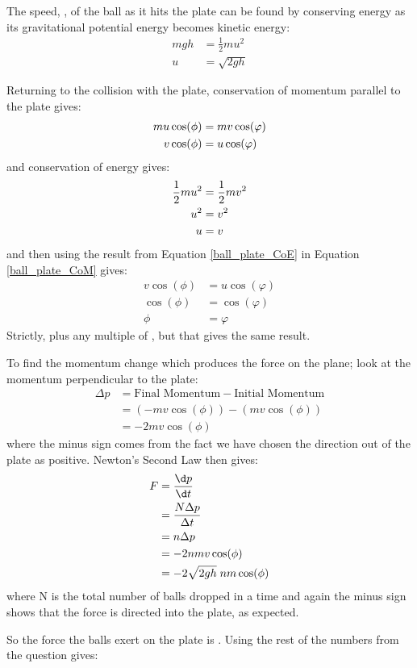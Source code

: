 \begin{problem}[HSC1946P1X1a]
{The speed, , of the ball as it hits the plate can be found by conserving energy as its gravitational potential energy becomes kinetic energy:
\begin{eqnarray*} 
mgh &= \frac{1}{2}mu^{2} \\ 
u &= \sqrt{2gh}
\end{eqnarray*}

Returning to the collision with the plate, conservation of momentum parallel to the plate gives:
\begin{eqnarray*}
 mu\cos(\phi) &= mv\cos(\varphi) \notag \\ 
 v\cos(\phi) &= u\cos(\varphi) \label{ball_plate_CoM} 
 \end{eqnarray*}
and conservation of energy gives:
\begin{eqnarray*}
 \frac{1}{2}mu^{2} &= \frac{1}{2}{m}v^{2} \notag \\ 
 u^{2} &= v^{2} \notag \\ 
 u &= v \label{ball_plate_CoE} 
\end{eqnarray*}
and then using the result from Equation \eqref{ball_plate_CoE} in Equation \eqref{ball_plate_CoM} gives:
\begin{eqnarray*} 
v\cos(\phi) &= u\cos(\varphi) \\ 
\cos(\phi) &= \cos(\varphi) \\ 
\phi &= \varphi
\end{eqnarray*}
Strictly,  plus any multiple of \quantity{2\pi}{}, but that gives the same result.

To find the momentum change which produces the force on the plane; look at the momentum perpendicular to the plate:
\begin{eqnarray*}
 \Delta p &= \text{Final Momentum} - \text{Initial Momentum} \\ 
 &= (-mv\cos(\phi)) - (mv\cos(\phi)) \\ 
 &= -2mv\cos(\phi) 
 \end{eqnarray*}
where the minus sign comes from the fact we have chosen the direction out of the plate as positive. Newton's Second Law then gives:
\begin{eqnarray*} 
F &= \frac{\d p}{\d t} \\ 
&= \frac{N \Delta p}{\Delta t} \\ 
&= n\Delta p \\ &= -2nmv\cos(\phi) \\ 
&= -2\sqrt{2gh}\;nm\cos(\phi) 
\end{eqnarray*}
where N is the total number of balls dropped in a time  and again the minus sign shows that the force is directed into the plate, as expected.

So the force the balls exert on the plate is . Using the rest of the numbers from the question gives:
}
\end{problem}